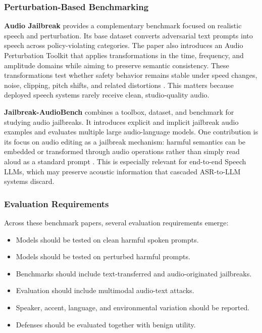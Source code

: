 \subsubsection{Perturbation-Based Benchmarking}

\textbf{Audio Jailbreak} provides a complementary benchmark focused on realistic speech and perturbation. Its base dataset converts adversarial text prompts into speech across policy-violating categories. The paper also introduces an Audio Perturbation Toolkit that applies transformations in the time, frequency, and amplitude domains while aiming to preserve semantic consistency. These transformations test whether safety behavior remains stable under speed changes, noise, clipping, pitch shifts, and related distortions \citep{song2025audiojailbreakopencomprehensive}. This matters because deployed speech systems rarely receive clean, studio-quality audio.

\textbf{Jailbreak-AudioBench} combines a toolbox, dataset, and benchmark for studying audio jailbreaks. It introduces explicit and implicit jailbreak audio examples and evaluates multiple large audio-language models. One contribution is its focus on audio editing as a jailbreak mechanism: harmful semantics can be embedded or transformed through audio operations rather than simply read aloud as a standard prompt \citep{cheng2026jailbreakaudiobenchindepthevaluationanalysis}. This is especially relevant for end-to-end Speech LLMs, which may preserve acoustic information that cascaded ASR-to-LLM systems discard.

\subsubsection{Evaluation Requirements}

Across these benchmark papers, several evaluation requirements emerge:

\begin{itemize}
\item Models should be tested on clean harmful spoken prompts.
\item Models should be tested on perturbed harmful prompts.
\item Benchmarks should include text-transferred and audio-originated jailbreaks.
\item Evaluation should include multimodal audio-text attacks.
\item Speaker, accent, language, and environmental variation should be reported.
\item Defenses should be evaluated together with benign utility.
\end{itemize}

